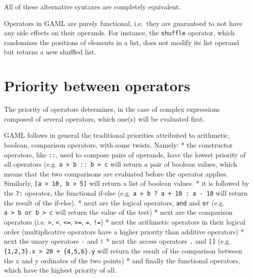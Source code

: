 \documentclass[]{book}
\theoremstyle{definition}
\theoremstyle{definition}
\theoremstyle{definition}
\theoremstyle{remark}
\begin{document}
All of these alternative syntaxes are completely equivalent.

Operators in GAML are purely functional, i.e.~they are guaranteed to not
have any side effects on their operands. For instance, the
\texttt{shuffle} operator, which randomizes the positions of elements in
a list, does not modify its list operand but returns a new shuffled
list.

\section{\texorpdfstring{}{ }}\label{section-22}

\section{Priority between operators}\label{priority-between-operators-4}

The priority of operators determines, in the case of complex expressions
composed of several operators, which one(s) will be evaluated first.

GAML follows in general the traditional priorities attributed to
arithmetic, boolean, comparison operators, with some twists. Namely: *
the constructor operators, like \texttt{::}, used to compose pairs of
operands, have the lowest priority of all operators (e.g.
\texttt{a\ \textgreater{}\ b\ ::\ b\ \textgreater{}\ c} will return a
pair of boolean values, which means that the two comparisons are
evaluated before the operator applies. Similarly,
\texttt{{[}a\ \textgreater{}\ 10,\ b\ \textgreater{}\ 5{]}} will return
a list of boolean values. * it is followed by the \texttt{?:} operator,
the functional if-else (e.g.
\texttt{a\ \textgreater{}\ b\ ?\ a\ +\ 10\ :\ a\ -\ 10} will return the
result of the if-else). * next are the logical operators, \texttt{and}
and \texttt{or} (e.g.
\texttt{a\ \textgreater{}\ b\ or\ b\ \textgreater{}\ c} will return the
value of the test) * next are the comparison operators (i.e.
\texttt{\textgreater{}}, \texttt{\textless{}}, \texttt{\textless{}=},
\texttt{\textgreater{}=}, \texttt{=}, \texttt{!=}) * next the arithmetic
operators in their logical order (multiplicative operators have a higher
priority than additive operators) * next the unary operators \texttt{-}
and \texttt{!} * next the access operators \texttt{.} and
\texttt{{[}{]}} (e.g.
\texttt{\{1,2,3\}.x\ \textgreater{}\ 20\ +\ \{4,5,6\}.y} will return the
result of the comparison between the x and y ordinates of the two
points) * and finally the functional operators, which have the highest
priority of all.
\end{document}
